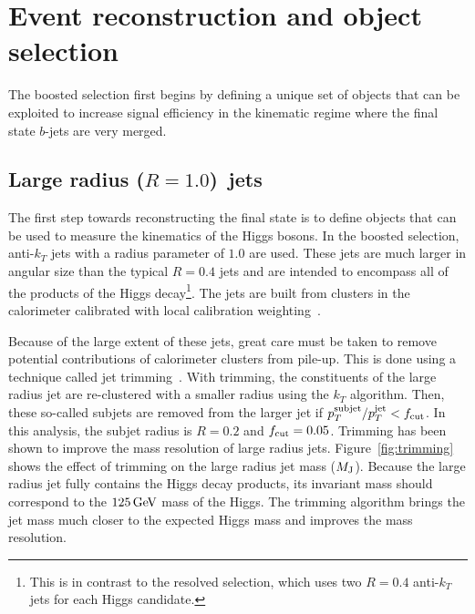 \section{Event reconstruction and object selection}

The boosted selection first begins by defining a unique set of objects that can be exploited to increase signal efficiency in the kinematic regime where the final state $b$-jets are very merged. 

\subsection{Large radius ($R = 1.0$)\, jets}

The first step towards reconstructing the final state is to define objects that can be used to measure the kinematics of the Higgs bosons. In the boosted selection, anti-$k_{T}$ jets with a radius parameter of $1.0$ are used. These jets are much larger in angular size than the typical $R=0.4$ jets and are intended to encompass all of the products of the Higgs decay\footnote{This is in contrast to the resolved selection, which uses two $R=0.4$ anti-$k_{T}$ jets for each Higgs candidate.}. The jets are built from clusters in the calorimeter calibrated with local calibration weighting~\cite{JetCalib}. 

Because of the large extent of these jets, great care must be taken to remove potential contributions of calorimeter clusters from pile-up. This is done using a technique called jet trimming~\cite{Trimming}. With trimming, the constituents of the large radius jet are re-clustered with a smaller radius using the $k_{T}$ algorithm. Then, these so-called subjets are removed from the larger jet if $p_{T}^{\rm subjet}/p_{T}^{\rm jet} < f_{\rm cut}$. In this analysis, the subjet radius is $R = 0.2$ and $f_{\rm cut} = 0.05$. Trimming has been shown to improve the mass resolution of large radius jets. Figure~\ref{fig:trimming} shows the effect of trimming on the large radius jet mass ($M_{\rm J}$). Because the large radius jet fully contains the Higgs decay products, its invariant mass should correspond to the $125 \GeV$ mass of the Higgs. The trimming algorithm brings the jet mass much closer to the expected Higgs mass and improves the mass resolution. 

